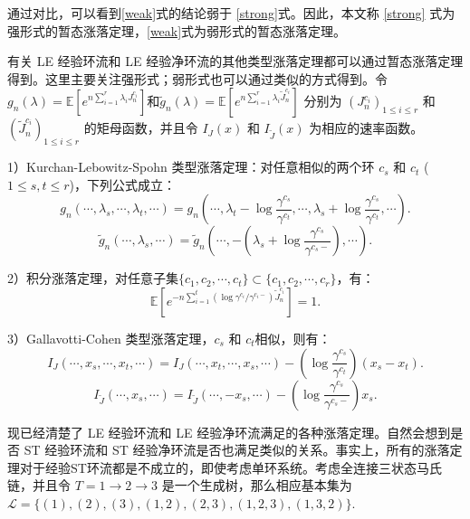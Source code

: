 通过对比，可以看到\eqref{weak}式的结论弱于 \eqref{strong}式。因此，本文称 \eqref{strong} 式为强形式的暂态涨落定理，\eqref{weak}式为弱形式的暂态涨落定理。

有关 LE 经验环流和 LE 经验净环流的其他类型涨落定理都可以通过暂态涨落定理得到。这里主要关注强形式；弱形式也可以通过类似的方式得到。令$g_n(\lambda) = \mathbb{E}[e^{n\sum_{i=1}^r\lambda_i J^{c_i}_n}]$和$\tilde{g}_n(\lambda) = \mathbb{E}[e^{n\sum_{i=1}^{r}\lambda_i\tilde{J}^{c_i}_n}]$ 分别为 $(J^{c_i}_n)_{1\le i\le r}$ 和 $(\tilde{J}^{c_i}_n)_{1\le i\le r}$ 的矩母函数，并且令 $I_{J}(x)$ 和 $I_{\tilde{J}}(x)$ 为相应的速率函数。

1）Kurchan-Lebowitz-Spohn 类型涨落定理：对任意相似的两个环 $c_s$ 和 $c_t$ ($1\le s,t\le r$)，下列公式成立：
\begin{equation*}
	g_n(\cdots,\lambda_s,\cdots,\lambda_t,\cdots) = g_n\left(\cdots,\lambda_t-\log\frac{\gamma^{c_s}}{\gamma^{c_t}},\cdots,\lambda_s+\log\frac{\gamma^{c_s}}{\gamma^{c_t}},\cdots\right).
\end{equation*}
\begin{equation*}
	\tilde{g}_n(\cdots,\lambda_s,\cdots)=\tilde{g}_n\left(\cdots,-\left(\lambda_s+\log\frac{\gamma^{c_s}}{\gamma^{c_s-}}\right),\cdots\right).
\end{equation*}

2）积分涨落定理，对任意子集$\{c_1,c_2,\cdots, c_t\} \subset \{c_1,c_2,\cdots, c_r\}$，有： 
\begin{equation*}
	\mathbb{E}\left[e^{-n\sum_{i=1}^t(\log \gamma^{c_i}/\gamma^{c_i-})\tilde{J}^{c_i}_n}\right]=1.
\end{equation*}

3）Gallavotti-Cohen 类型涨落定理，$c_s$ 和 $c_t$相似，则有：
\begin{equation*}
	I_J(\cdots,x_s,\cdots,x_t,\cdots)=I_J(\cdots,x_t,\cdots,x_s,\cdots)-\left(\log\frac{\gamma^{c_s}}{\gamma^{c_t}}\right)(x_s-x_t).
\end{equation*}
\begin{equation*}
	I_{\tilde{J}}(\cdots,x_s,\cdots) = I_{\tilde{J}}(\cdots,-x_s,\cdots)-\left(\log\frac{\gamma^{c_s}}{\gamma^{c_s-}}\right)x_s.
\end{equation*}

现已经清楚了 LE 经验环流和 LE 经验净环流满足的各种涨落定理。自然会想到是否 ST 经验环流和 ST 经验净环流是否也满足类似的关系。事实上，所有的涨落定理对于经验ST环流都是不成立的，即使考虑单环系统。考虑全连接三状态马氏链，并且令 $T = 1\to 2\to 3$ 是一个生成树，那么相应基本集为$\mathcal{L} = \{(1),(2),(3),(1,2),(2,3),(1,2,3),(1,3,2)\}.$

